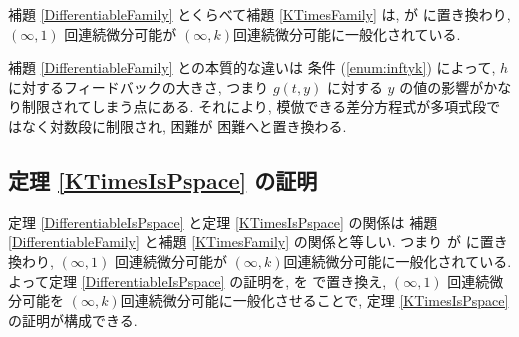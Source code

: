 補題 \ref{DifferentiableFamily} とくらべて補題 \ref{KTimesFamily} は,
\PSPACE が \DIVPlog に置き換わり, $(\infty, 1)$ 回連続微分可能が 
$(\infty, k)$回連続微分可能に一般化されている.

補題 \ref{DifferentiableFamily} との本質的な違いは
条件 (\ref{enum:inftyk}) によって, $h$ に対するフィードバックの大きさ,
つまり $g(t,y)$ に対する $y$ の値の影響がかなり制限されてしまう点にある.
それにより, 模倣できる差分方程式が多項式段ではなく対数段に制限され,
\PSPACE 困難が \DIVPlog 困難へと置き換わる.




\subsection{定理 \ref{KTimesIsPspace} の証明}

定理 \ref{DifferentiableIsPspace} と定理 \ref{KTimesIsPspace} の関係は
補題 \ref{DifferentiableFamily} と補題 \ref{KTimesFamily} の関係と等しい.
つまり \PSPACE が \DIVPlog に置き換わり,
$(\infty, 1)$ 回連続微分可能が $(\infty, k)$回連続微分可能に一般化されている.
よって定理 \ref{DifferentiableIsPspace} の証明を, \PSPACE を \DIVPlog で置き換え,
$(\infty, 1)$ 回連続微分可能を $(\infty, k)$回連続微分可能に一般化させることで,
定理 \ref{KTimesIsPspace} の証明が構成できる.

